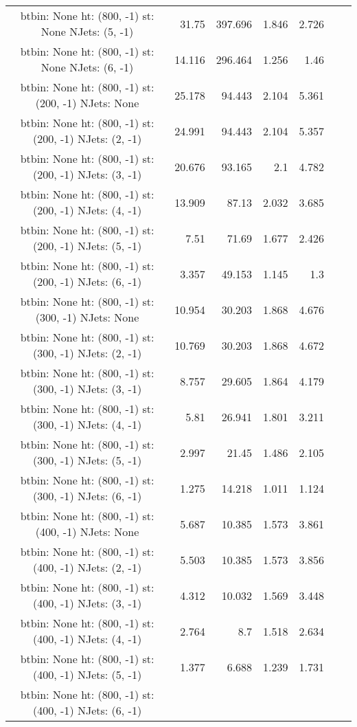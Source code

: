 \documentclass[12pt]{paper}
\begin{document}
\begin{landscape}
\begin{longtable}{c|r|r|r|r|r|r}
btbin:  None ht:  (800, -1) st:  None NJets:  (5, -1)
 & 31.75 & 397.696 & 1.846 & 2.726\\
btbin:  None ht:  (800, -1) st:  None NJets:  (6, -1)
 & 14.116 & 296.464 & 1.256 & 1.46\\
btbin:  None ht:  (800, -1) st:  (200, -1) NJets:  None
 & 25.178 & 94.443 & 2.104 & 5.361\\
btbin:  None ht:  (800, -1) st:  (200, -1) NJets:  (2, -1)
 & 24.991 & 94.443 & 2.104 & 5.357\\
btbin:  None ht:  (800, -1) st:  (200, -1) NJets:  (3, -1)
 & 20.676 & 93.165 & 2.1 & 4.782\\
btbin:  None ht:  (800, -1) st:  (200, -1) NJets:  (4, -1)
 & 13.909 & 87.13 & 2.032 & 3.685\\
btbin:  None ht:  (800, -1) st:  (200, -1) NJets:  (5, -1)
 & 7.51 & 71.69 & 1.677 & 2.426\\
btbin:  None ht:  (800, -1) st:  (200, -1) NJets:  (6, -1)
 & 3.357 & 49.153 & 1.145 & 1.3\\
btbin:  None ht:  (800, -1) st:  (300, -1) NJets:  None
 & 10.954 & 30.203 & 1.868 & 4.676\\
btbin:  None ht:  (800, -1) st:  (300, -1) NJets:  (2, -1)
 & 10.769 & 30.203 & 1.868 & 4.672\\
btbin:  None ht:  (800, -1) st:  (300, -1) NJets:  (3, -1)
 & 8.757 & 29.605 & 1.864 & 4.179\\
btbin:  None ht:  (800, -1) st:  (300, -1) NJets:  (4, -1)
 & 5.81 & 26.941 & 1.801 & 3.211\\
btbin:  None ht:  (800, -1) st:  (300, -1) NJets:  (5, -1)
 & 2.997 & 21.45 & 1.486 & 2.105\\
btbin:  None ht:  (800, -1) st:  (300, -1) NJets:  (6, -1)
 & 1.275 & 14.218 & 1.011 & 1.124\\
btbin:  None ht:  (800, -1) st:  (400, -1) NJets:  None
 & 5.687 & 10.385 & 1.573 & 3.861\\
btbin:  None ht:  (800, -1) st:  (400, -1) NJets:  (2, -1)
 & 5.503 & 10.385 & 1.573 & 3.856\\
btbin:  None ht:  (800, -1) st:  (400, -1) NJets:  (3, -1)
 & 4.312 & 10.032 & 1.569 & 3.448\\
btbin:  None ht:  (800, -1) st:  (400, -1) NJets:  (4, -1)
 & 2.764 & 8.7 & 1.518 & 2.634\\
btbin:  None ht:  (800, -1) st:  (400, -1) NJets:  (5, -1)
 & 1.377 & 6.688 & 1.239 & 1.731\\
btbin:  None ht:  (800, -1) st:  (400, -1) NJets:  (6, -1)

\end{longtable}
\end{landscape}
\end{document}
